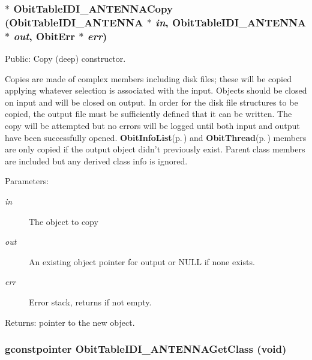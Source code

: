 \subsubsection{$\ast$ Obit\-Table\-IDI\_\-ANTENNACopy ({\bf Obit\-Table\-IDI\_\-ANTENNA} $\ast$ {\em in}, {\bf Obit\-Table\-IDI\_\-ANTENNA} $\ast$ {\em out}, {\bf Obit\-Err} $\ast$ {\em err})}\label{ObitTableIDI__ANTENNA_8h_a14}


Public: Copy (deep) constructor. 

Copies are made of complex members including disk files; these will be copied applying whatever selection is associated with the input. Objects should be closed on input and will be closed on output. In order for the disk file structures to be copied, the output file must be sufficiently defined that it can be written. The copy will be attempted but no errors will be logged until both input and output have been successfully opened. {\bf Obit\-Info\-List}{\rm (p.\,\pageref{structObitInfoList})} and {\bf Obit\-Thread}{\rm (p.\,\pageref{structObitThread})} members are only copied if the output object didn't previously exist. Parent class members are included but any derived class info is ignored. \begin{Desc}
\item[Parameters:]
\begin{description}
\item[{\em in}]The object to copy \item[{\em out}]An existing object pointer for output or NULL if none exists. \item[{\em err}]Error stack, returns if not empty. \end{description}
\end{Desc}
\begin{Desc}
\item[Returns:]pointer to the new object. \end{Desc}
\subsubsection{\setlength{\rightskip}{0pt plus 5cm}gconstpointer Obit\-Table\-IDI\_\-ANTENNAGet\-Class (void)}\label{ObitTableIDI__ANTENNA_8h_a13}


